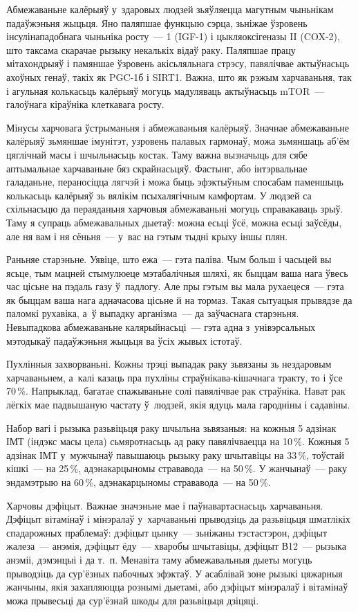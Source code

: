 Абмежаваньне калёрыяў у~здаровых людзей зьяўляецца магутным чыньнікам падаўжэньня жыцьця. Яно паляпшае функцыю сэрца, зьніжае ўзровень інсулінападобнага чыньніка росту~--- 1 (IGF-1) і цыкляоксігеназы II (COX-2), што таксама скарачае рызыку некалькіх відаў раку. Паляпшае працу мітахондрыяў і памяншае ўзровень акісьляльнага стрэсу, павялічвае актыўнасьць ахоўных генаў, такіх як PGC-1б і SIRT1. Важна, што як рэжым харчаваньня, так і агульная колькасьць калёрыяў могуць мадуляваць актыўнасьць mTOR~--- галоўнага кіраўніка клеткавага росту.

Мінусы харчовага ўстрыманьня і абмежаваньня калёрыяў. Значнае абмежаваньне калёрыяў зьмяншае імунітэт, узровень палавых гармонаў, можа зьмяншаць аб'ём цяглічнай масы і шчыльнасьць костак. Таму важна вызначыць для сябе аптымальнае харчаваньне бяз скрайнасьцяў. Фастынг, або інтэрвальнае галаданьне, пераносіцца лягчэй і можа быць эфэктыўным спосабам паменшыць колькасьць калёрыяў зь вялікім псыхалягічным камфортам. У людзей са схільнасьцю да пераяданьня харчовыя абмежаваньні могуць справакаваць зрыў. Таму я супраць абмежавальных дыетаў: можна есьці ўсё, можна есьці заўсёды, але ня вам і ня сёньня~--- у~вас на гэтым тыдні крыху іншы плян.

Раньняе старэньне. Уявіце, што ежа~--- гэта паліва. Чым больш і часьцей вы ясьце, тым мацней стымулюеце мэтабалічныя шляхі, як быццам ваша нага ўвесь час цісьне на пэдаль газу ў~падлогу. Але пры гэтым вы мала рухаецеся~--- гэта як быццам ваша нага адначасова цісьне й на тормаз. Такая сытуацыя прывядзе да паломкі рухавіка, а~ў выпадку арганізма~--- да заўчаснага старэньня. Невыпадкова абмежаваньне калярыйнасьці~--- гэта адна з~унівэрсальных мэтодыкаў падаўжэньня жыцьця ва ўсіх жывых істотаў.

Пухлінныя захворваньні. Кожны трэці выпадак раку зьвязаны зь нездаровым харчаваньнем, а~калі казаць пра пухліны страўнікава-кішачнага тракту, то і ўсе 70\,\%. Напрыклад, багатае спажываньне солі павялічвае рак страўніка. Нават рак лёгкіх мае падвышаную частату ў~людзей, якія ядуць мала гародніны і садавіны.

Набор вагі і рызыка разьвіцьця раку шчыльна зьвязаныя: на кожныя 5 адзінак ІМТ (індэкс масы цела) сьмяротнасьць ад раку павялічваецца на 10\,\%. Кожныя 5 адзінак ІМТ у~мужчынаў павышаюць рызыку раку шчытавіцы на 33\,\%, тоўстай кішкі~--- на 25\,\%, адэнакарцыномы стрававода~--- на 50\,\%. У жанчынаў~--- раку эндамэтрыю на 60\,\%, адэнакарцыномы стрававода~--- на 50\,\%.

Харчовы дэфіцыт. Важнае значэньне мае і паўнавартаснасьць харчаваньня. Дэфіцыт вітамінаў і мінэралаў у~харчаваньні прыводзіць да разьвіцьця шматлікіх спадарожных праблемаў: дэфіцыт цынку~--- зьніжаны тэстастэрон, дэфіцыт жалеза~--- анэмія, дэфіцыт ёду~--- хваробы шчытавіцы, дэфіцыт В12~--- рызыка анэміі, дэмэнцыі і да т.~п. Менавіта таму абмежавальныя дыеты могуць прыводзіць да сур'ёзных пабочных эфэктаў. У асаблівай зоне рызыкі цяжарныя жанчыны, якія захапляюцца рознымі дыетамі, або дэфіцыт мінэралаў і вітамінаў можа прывесьці да сур'ёзнай шкоды для разьвіцьця дзіцяці.

